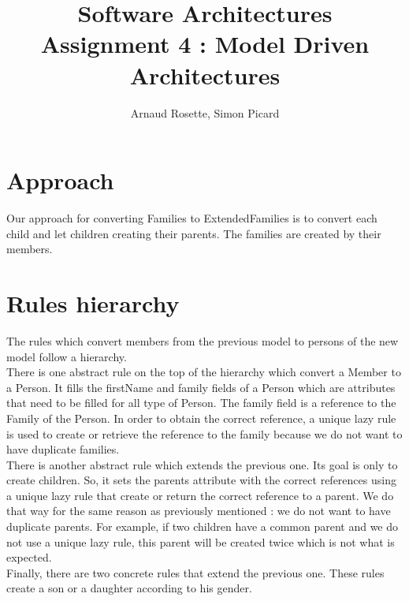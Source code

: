 \documentclass[a4paper,10pt]{article}
\title{Software Architectures\\ Assignment 4 : Model Driven Architectures}
\author{Arnaud Rosette, Simon Picard}
\begin{document}
\maketitle
\section{Approach}
Our approach for converting Families to ExtendedFamilies is to convert each child and let children creating their parents. The families are created by their members.
\section{Rules hierarchy}
The rules which convert members from the previous model to persons of the new model follow a hierarchy. \\
There is one abstract rule on the top of the hierarchy which convert a Member to a Person. It fills the firstName and family fields of a Person which are attributes that need to be filled for all type of Person. The family field is a reference to the Family of the Person. In order to obtain the correct reference, a unique lazy rule is used to create or retrieve the reference to the family because we do not want to have duplicate families.\\
There is another abstract rule which extends the previous one. Its goal is only to create children. So, it sets the parents attribute with the correct references using a unique lazy rule that create or return the correct reference to a parent. We do that way for the same reason as previously mentioned : we do not want to have duplicate parents. For example, if two children have a common parent and we do not use a unique lazy rule, this parent will be created twice which is not what is expected.\\
Finally, there are two concrete rules that extend the previous one. These rules create a son or a daughter according to his gender.
\end{document}
